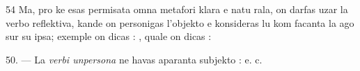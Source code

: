 \begin{VUpage}[58]{54}
Ma, pro ke esas permisata omna metafori klara e natu\cc
rala, on darfas uzar la verbo reflektiva, kande on personigas\nl
l'objekto e konsideras lu kom facanta la ago sur su ipsa;\nl
exemple on dicas : , quale on\nl
dicas : 

\VUblanc{4.73pt}%
50. --- La \textit{verbi unpersona} ne havas aparanta subjekto :\nl
{}\nl
{} e. c.
\end{VUpage}


